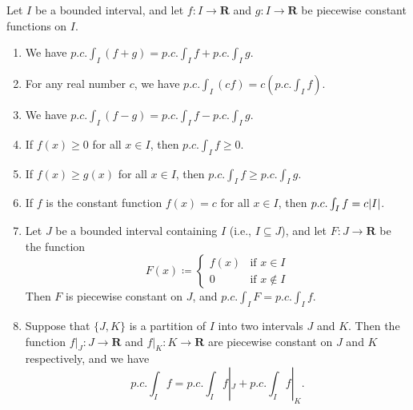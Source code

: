 \setcounter{theorem}{15}
\begin{theorem}\label{11.2.16}
    Let \(I\) be a bounded interval, and let \(f : I \to \mathbf{R}\) and \(g : I \to \mathbf{R}\) be piecewise constant functions on \(I\).
    \begin{enumerate}
        \item We have \(p.c. \int_I (f + g) = p.c. \int_I f + p.c. \int_I g\).
        \item For any real number \(c\), we have \(p.c. \int_I (cf) = c (p.c. \int_I f)\).
        \item We have \(p.c. \int_I (f - g) = p.c. \int_I f - p.c. \int_I g\).
        \item If \(f(x) \geq 0\) for all \(x \in I\), then \(p.c. \int_I f \geq 0\).
        \item If \(f(x) \geq g(x)\) for all \(x \in I\), then \(p.c. \int_I f \geq p.c. \int_I g\).
        \item If \(f\) is the constant function \(f(x) = c\) for all \(x \in I\), then \(p.c. \int_I f = c \abs*{I}\).
        \item Let \(J\) be a bounded interval containing \(I\) (i.e., \(I \subseteq J\)), and let \(F : J \to \mathbf{R}\) be the function
              \[
                  F(x) \coloneqq \begin{cases}
                      f(x) & \text{if } x \in I    \\
                      0    & \text{if } x \notin I
                  \end{cases}
              \]
              Then \(F\) is piecewise constant on \(J\), and \(p.c. \int_I F = p.c. \int_I f\).
        \item Suppose that \(\{J, K\}\) is a partition of \(I\) into two intervals \(J\) and \(K\).
              Then the function \(f|_J : J \to \mathbf{R}\) and \(f|_K : K \to \mathbf{R}\) are piecewise constant on \(J\) and \(K\) respectively, and we have
              \[
                  p.c. \int_I f = p.c. \int_I f|_J + p.c. \int_I f|_K.
              \]
    \end{enumerate}
\end{theorem}

